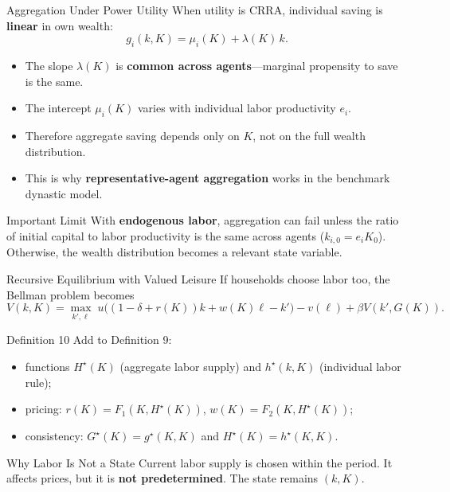 \documentclass[aspectratio=169,10pt]{beamer}
\begin{document}
\begin{frame}{Aggregation Under Power Utility}
When utility is CRRA, individual saving is \textbf{linear} in own wealth:
\[
g_i(k,K)=\mu_i(K)+\lambda(K)\,k.
\]

\begin{itemize}
  \item The slope $\lambda(K)$ is \textbf{common across agents}---marginal propensity to save is the same.
  \item The intercept $\mu_i(K)$ varies with individual labor productivity $e_i$.
  \item Therefore aggregate saving depends only on $K$, not on the full wealth distribution.
  \item This is why \textbf{representative-agent aggregation} works in the benchmark dynastic model.
\end{itemize}

\begin{block}{Important Limit}
With \textbf{endogenous labor}, aggregation can fail unless the ratio of initial capital to labor productivity is the same across agents ($k_{i,0}=e_i K_0$). Otherwise, the wealth distribution becomes a relevant state variable.
\end{block}
\end{frame}

\begin{frame}{Recursive Equilibrium with Valued Leisure}
If households choose labor too, the Bellman problem becomes
\[
V(k,K)
=
\max_{k',\ell}\;
u\big((1-\delta+r(K))k+w(K)\ell-k'\big)-v(\ell)
+\beta V(k',G(K)).
\]

\begin{block}{Definition 10}
Add to Definition 9:
\begin{itemize}
  \item functions $H^\star(K)$ (aggregate labor supply) and $h^\star(k,K)$ (individual labor rule);
  \item pricing: $r(K)=F_1(K,H^\star(K))$, $w(K)=F_2(K,H^\star(K))$;
  \item consistency: $G^\star(K)=g^\star(K,K)$ and $H^\star(K)=h^\star(K,K)$.
\end{itemize}
\end{block}

\begin{block}{Why Labor Is Not a State}
Current labor supply is chosen within the period. It affects prices, but it is \textbf{not predetermined}. The state remains $(k,K)$.
\end{block}
\end{frame}
\end{document}
